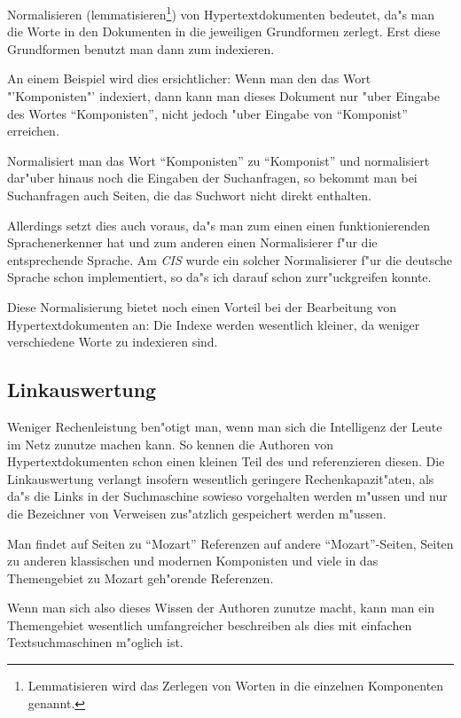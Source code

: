 Normalisieren (lemmatisieren\footnote{Lemmatisieren wird das Zerlegen von Worten in die einzelnen Komponenten genannt.}) von Hypertextdokumenten bedeutet, da"s man die Worte in den Dokumenten in die jeweiligen Grundformen zerlegt. Erst diese Grundformen benutzt man dann zum indexieren.

An einem Beispiel wird dies ersichtlicher: Wenn man den das Wort "'Komponisten"' indexiert, dann kann man dieses Dokument nur "uber Eingabe des Wortes "`Komponisten"', nicht jedoch "uber Eingabe von "`Komponist"' erreichen.

Normalisiert man das Wort "`Komponisten"' zu "`Komponist"' und normalisiert dar"uber hinaus noch die Eingaben der Suchanfragen, so bekommt man bei Suchanfragen auch Seiten, die das Suchwort nicht direkt enthalten.

Allerdings setzt dies auch voraus, da"s man zum einen einen funktionierenden Sprachenerkenner hat und zum anderen einen Normalisierer f"ur die entsprechende Sprache. Am {\em CIS} wurde ein solcher Normalisierer f"ur die deutsche Sprache schon implementiert, so da"s ich darauf schon zurr"uckgreifen konnte.

Diese Normalisierung bietet noch einen Vorteil bei der Bearbeitung von Hypertextdokumenten an: Die Indexe werden wesentlich kleiner, da weniger verschiedene Worte zu indexieren sind.


\subsection{Linkauswertung}

Weniger Rechenleistung ben"otigt man, wenn man sich die Intelligenz der Leute im Netz zunutze machen kann. So kennen die Authoren von Hypertextdokumenten schon einen kleinen Teil des \www und referenzieren diesen. Die Linkauswertung verlangt insofern wesentlich geringere Rechenkapazit"aten, als da"s die Links in der Suchmaschine sowieso vorgehalten werden m"ussen und nur die Bezeichner von Verweisen zus"atzlich gespeichert werden m"ussen.

Man findet auf Seiten zu "`Mozart"' Referenzen auf andere "`Mozart"'-Seiten, Seiten zu anderen klassischen und modernen Komponisten und viele in das Themengebiet zu Mozart geh"orende Referenzen.

Wenn man sich also dieses Wissen der Authoren zunutze macht, kann man ein Themengebiet wesentlich umfangreicher beschreiben als dies mit einfachen Textsuchmaschinen m"oglich ist.

